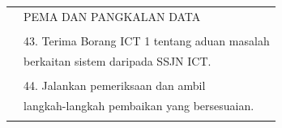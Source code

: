 \documentclass[
]{article}
\begin{document}
\begin{longtable}[]{@{}ll@{}}
\begin{minipage}[t]{0.23\columnwidth}
\end{minipage} & \begin{minipage}[t]{0.71\columnwidth}\raggedright
PEMA DAN PANGKALAN DATA\strut
\end{minipage}\tabularnewline
\begin{minipage}[t]{0.23\columnwidth}\raggedright
\strut
\end{minipage} & \begin{minipage}[t]{0.71\columnwidth}\raggedright
\strut
\end{minipage}\tabularnewline
\begin{minipage}[t]{0.23\columnwidth}\raggedright
\strut
\end{minipage} & \begin{minipage}[t]{0.71\columnwidth}\raggedright
43. Terima Borang ICT 1 tentang aduan masalah\strut
\end{minipage}\tabularnewline
\begin{minipage}[t]{0.23\columnwidth}\raggedright
\strut
\end{minipage} & \begin{minipage}[t]{0.71\columnwidth}\raggedright
berkaitan sistem daripada SSJN ICT.\strut
\end{minipage}\tabularnewline
\begin{minipage}[t]{0.23\columnwidth}\raggedright
\strut
\end{minipage} & \begin{minipage}[t]{0.71\columnwidth}\raggedright
\strut
\end{minipage}\tabularnewline
\begin{minipage}[t]{0.23\columnwidth}\raggedright
\strut
\end{minipage} & \begin{minipage}[t]{0.71\columnwidth}\raggedright
44. Jalankan pemeriksaan dan ambil\strut
\end{minipage}\tabularnewline
\begin{minipage}[t]{0.23\columnwidth}\raggedright
\strut
\end{minipage} & \begin{minipage}[t]{0.71\columnwidth}\raggedright
langkah-langkah pembaikan yang bersesuaian.\strut
\end{minipage}\tabularnewline
\begin{minipage}[t]{0.23\columnwidth}\raggedright
\strut
\end{minipage} & \begin{minipage}[t]{0.71\columnwidth}\raggedright
\strut
\end{minipage}\tabularnewline

\end{longtable}
\end{document}
